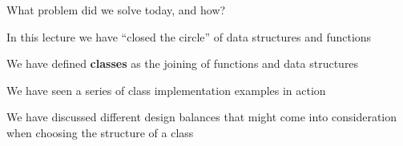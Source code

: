 \documentclass{beamer}
\begin{document}
\begin{slide}{
\item What problem did we solve today, and how?
}\end{slide}

\begin{slide}{
\item In this lecture we have ``closed the circle'' of data structures and functions
\item We have defined \textbf{classes} as the joining of functions and data structures
\item We have seen a series of class implementation examples in action
\item We have discussed different design balances that might come into consideration when choosing the structure of a class
}\end{slide}

\begin{thankyou}
\end{thankyou}
\end{document}
